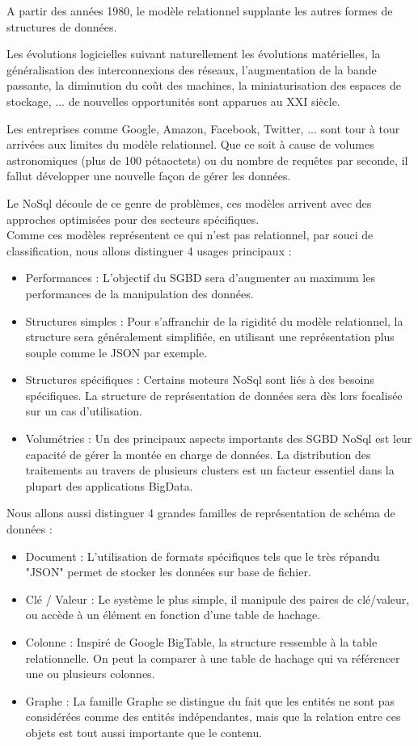 \documentclass[a4paper,fleqn,12pt]{report}
\begin{document}
A partir des années 1980, le modèle relationnel supplante les autres formes de structures de données.

Les évolutions logicielles suivant naturellement les évolutions matérielles, la généralisation des interconnexions des réseaux, l'augmentation de la bande passante, la diminution du coût des machines, la miniaturisation des espaces de stockage, ... de nouvelles opportunités sont apparues au XXI siècle.

Les entreprises comme Google, Amazon, Facebook, Twitter, ... sont tour à tour arrivées aux limites du modèle relationnel. Que ce soit à cause de volumes astronomiques (plus de 100 pétaoctets) ou du nombre de requêtes par seconde, il fallut développer une nouvelle façon de gérer les données.

Le NoSql découle de ce genre de problèmes, ces modèles arrivent avec des approches optimisées pour des secteurs spécifiques. \\
Comme ces modèles représentent ce qui n'est pas relationnel, par souci de classification, nous allons distinguer 4 usages principaux :

\begin{itemize}
\item Performances : L'objectif du SGBD sera d'augmenter au maximum les performances de la manipulation des données. 
\item Structures simples : Pour s’affranchir de la rigidité du modèle relationnel, la structure sera généralement simplifiée, en utilisant une représentation plus souple comme le JSON par exemple.
\item Structures spécifiques : Certains moteurs NoSql sont liés à des besoins spécifiques. La structure de représentation de données sera dès lors focalisée sur un cas d'utilisation.
\item Volumétries : Un des principaux aspects importants des SGBD NoSql est leur capacité de gérer la montée en charge de données. La distribution des traitements au travers de plusieurs clusters est un facteur essentiel dans la plupart des applications BigData.
\end{itemize} 

Nous allons aussi distinguer 4 grandes familles de représentation de schéma de données :

\begin{itemize}
\item Document : L'utilisation de formats spécifiques tels que le très répandu "JSON" permet de stocker les données sur base de fichier.
\item Clé / Valeur : Le système le plus simple, il manipule des paires de clé/valeur, ou accède à un élément en fonction d'une table de hachage.
\item Colonne : Inspiré de Google BigTable, la structure ressemble à la table relationnelle. On peut la comparer à une table de hachage qui va référencer une ou plusieurs colonnes.
\item Graphe : La famille Graphe se distingue du fait que les entités ne sont pas considérées comme des entités indépendantes, mais que la relation entre ces objets est tout aussi importante que le contenu.
\end{itemize} 
\end{document}
